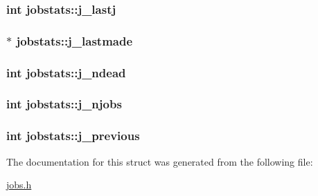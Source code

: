 \subsubsection[{\texorpdfstring{j\+\_\+lastj}{j_lastj}}]{\setlength{\rightskip}{0pt plus 5cm}int jobstats\+::j\+\_\+lastj}\hypertarget{structjobstats_ac29ea4e478fa590943c6f7ae902f3a46}{}\label{structjobstats_ac29ea4e478fa590943c6f7ae902f3a46}
\subsubsection[{\texorpdfstring{j\+\_\+lastmade}{j_lastmade}}]{$\ast$ jobstats\+::j\+\_\+lastmade}\hypertarget{structjobstats_ae904f7592ededb2bf0effc72444aab81}{}\label{structjobstats_ae904f7592ededb2bf0effc72444aab81}
\subsubsection[{\texorpdfstring{j\+\_\+ndead}{j_ndead}}]{\setlength{\rightskip}{0pt plus 5cm}int jobstats\+::j\+\_\+ndead}\hypertarget{structjobstats_a5c5a5b94e26c657b8caef74571c311ec}{}\label{structjobstats_a5c5a5b94e26c657b8caef74571c311ec}
\subsubsection[{\texorpdfstring{j\+\_\+njobs}{j_njobs}}]{\setlength{\rightskip}{0pt plus 5cm}int jobstats\+::j\+\_\+njobs}\hypertarget{structjobstats_a3cd30b59b6ea29dc4d58020e6004d718}{}\label{structjobstats_a3cd30b59b6ea29dc4d58020e6004d718}
\subsubsection[{\texorpdfstring{j\+\_\+previous}{j_previous}}]{\setlength{\rightskip}{0pt plus 5cm}int jobstats\+::j\+\_\+previous}\hypertarget{structjobstats_a10c9a2fa68d7fed880e9f9c5f2b4d7f8}{}\label{structjobstats_a10c9a2fa68d7fed880e9f9c5f2b4d7f8}


The documentation for this struct was generated from the following file\+:\begin{DoxyCompactItemize}
\item 
\hyperlink{jobs_8h}{jobs.\+h}\end{DoxyCompactItemize}
